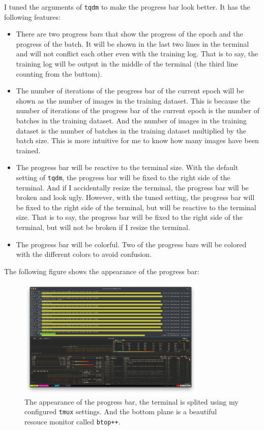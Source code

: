 I tuned the arguments of \texttt{tqdm} to make the progress bar look better.
It has the following features:
\begin{itemize}
    \item There are two progress bars that show the progress of the epoch and the progress of the batch.
          It will be shown in the last two lines in the terminal and will not conflict each other even with the training log.
          That is to say, the training log will be output in the middle of the terminal (the third line counting from the buttom).
    \item The number of iterations of the progress bar of the current epoch will be shown as the number of images in the training dataset.
          This is because the number of iterations of the progress bar of the current epoch is the number of batches in the training dataset.
          And the number of images in the training dataset is the number of batches in the training dataset multiplied by the batch size.
          This is more intuitive for me to know how many images have been trained.
    \item The progress bar will be reactive to the terminal size.
          With the default setting of \texttt{tqdm}, the progress bar will be fixed to the right side of the terminal.
          And if I accidentally resize the terminal, the progress bar will be broken and look ugly.
          However, with the tuned setting, the progress bar will be fixed to the right side of the terminal, but will be reactive to the terminal size.
          That is to say, the progress bar will be fixed to the right side of the terminal, but will not be broken if I resize the terminal.
    \item The progress bar will be colorful. Two of the progress bars will be colored with the different colors to avoid confusion.
\end{itemize}


The following figure shows the appearance of the progress bar:
\begin{figure}[H]
    \centering
    \includegraphics[width=0.8\textwidth]{./images/tqdm.png}
    \caption{The appearance of the progress bar, the terminal is splited using my configured \texttt{tmux} settings. And the bottom plane is a beautiful resouce monitor called \texttt{btop++}.}
    \label{fig:tqdm}
\end{figure}

